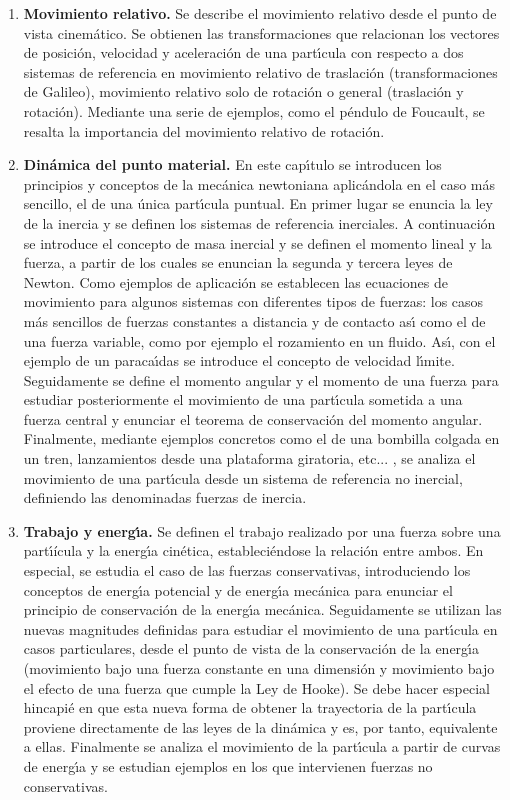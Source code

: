 \begin{enumerate} [{\bf 1. }]
\item {\bf  Movimiento relativo.}
Se describe el movimiento relativo desde el punto de vista cinem\'{a}tico. Se 
obtienen las transformaciones que relacionan
los vectores de posici\'{o}n, velocidad y aceleraci\'{o}n de una part\'{\i}cula
con respecto a dos sistemas de referencia en movimiento relativo de
 traslaci\'{o}n (transformaciones de Galileo), movimiento relativo solo 
de rotaci\'{o}n o general (traslaci\'{o}n y rotaci\'{o}n). 
Mediante una serie de ejemplos, como el p\'{e}ndulo de Foucault,
 se resalta la importancia del movimiento relativo 
de rotaci\'{o}n. 


\item {\bf  Din\'{a}mica del punto material.}
En este cap\'{\i}tulo se introducen los principios y conceptos de la
 mec\'{a}nica newtoniana aplic\'{a}ndola en el caso m\'{a}s sencillo, el de una
 \'{u}nica part\'{\i}cula puntual. En primer lugar se enuncia la ley de la inercia
 y se definen los sistemas de referencia inerciales. A continuaci\'{o}n se
 introduce el concepto de masa inercial y se definen el momento lineal y la fuerza, 
a partir de los cuales se enuncian la segunda y tercera leyes de Newton.
 Como ejemplos de aplicaci\'{o}n se establecen las ecuaciones de movimiento
 para algunos sistemas con diferentes tipos de fuerzas: los casos m\'{a}s
 sencillos de fuerzas constantes a distancia y de contacto
 as\'{\i} como el de una fuerza variable, como por ejemplo el rozamiento en un fluido.
As\'{\i}, con el ejemplo de un paraca\'{\i}das se 
introduce el concepto de velocidad l\'{\i}mite. Seguidamente se define el 
momento angular y el momento de una fuerza para estudiar posteriormente el
 movimiento de una part\'{\i}cula sometida a una fuerza central y enunciar
 el teorema de conservaci\'{o}n del momento angular.
 Finalmente, mediante ejemplos concretos como el de una bombilla colgada en un tren, lanzamientos
desde una plataforma giratoria, etc... , se analiza el movimiento de una 
part\'{\i}cula desde un sistema de referencia no inercial,
 definiendo las denominadas fuerzas de inercia. 

\item {\bf Trabajo y energ\'{\i}a.}
Se definen el trabajo realizado por una fuerza sobre una part\'{\i}ícula y
 la energ\'{\i}a cin\'{e}tica, estableci\'{e}ndose la relaci\'{o}n entre ambos.
 En especial, se estudia el caso de las fuerzas conservativas, introduciendo
 los conceptos de energ\'{\i}a potencial y de energ\'{\i}a mec\'{a}nica para
 enunciar el principio de conservaci\'{o}n de la energ\'{\i}a mec\'{a}nica.
 Seguidamente se utilizan las nuevas magnitudes definidas para estudiar el 
movimiento de una part\'{\i}cula en casos particulares, desde el punto de vista
 de la conservaci\'{o}n de la energ\'{\i}a (movimiento bajo una fuerza constante en
una dimensi\'{o}n y movimiento bajo el efecto de una fuerza que cumple la Ley de Hooke).
 Se debe hacer especial hincapi\'{e} 
en que esta nueva forma de obtener la trayectoria de la part\'{\i}cula proviene 
directamente de las leyes de la din\'{a}mica y es, por tanto, equivalente a ellas.
 Finalmente se analiza el movimiento de la part\'{\i}cula a partir de curvas
 de energ\'{\i}a y se estudian ejemplos en los que intervienen fuerzas 
no conservativas.


\end{enumerate}
